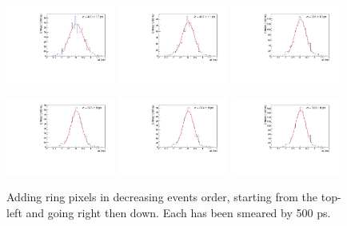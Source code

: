 \documentclass[twocolumn,aps,prd,reprint,superscriptaddress,floatfix]{revtex4-1}
\begin{document}
\begin{figure}[!htbp]
\centering
	\includegraphics[width=0.32\textwidth]{SKIROC_1_Pixels_NoCenter500.pdf}
	\includegraphics[width=0.32\textwidth]{SKIROC_2_Pixels_NoCenter500.pdf}
	\includegraphics[width=0.32\textwidth]{SKIROC_3_Pixels_NoCenter500.pdf}

	\includegraphics[width=0.32\textwidth]{SKIROC_4_Pixels_NoCenter500.pdf}
	\includegraphics[width=0.32\textwidth]{SKIROC_5_Pixels_NoCenter500.pdf}
	\includegraphics[width=0.32\textwidth]{SKIROC_6_Pixels_NoCenter500.pdf}
	\caption{Adding ring pixels in decreasing events order, starting from the top-left and going right then down.
		Each has been smeared by 500 ps.}
	\label{fig:500psAll_NoCenter}
\end{figure}
\end{document}
